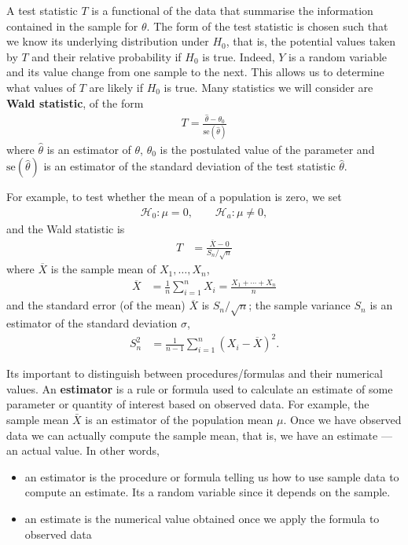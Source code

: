 \documentclass[
  11pt,
  letterpaper,
]{book}
\providecommand{\tightlist}{%
  \setlength{\itemsep}{0pt}\setlength{\parskip}{0pt}}
\theoremstyle{definition}
\theoremstyle{definition}
\theoremstyle{definition}
\theoremstyle{remark}
\begin{document}
A test statistic \(T\) is a functional of the data that summarise the information contained in the sample for \(\theta\). The form of the test statistic is chosen such that we know its underlying distribution under \(H_0\), that is, the potential values taken by \(T\) and their relative probability if \(H_0\) is true. Indeed, \(Y\) is a random variable and its value change from one sample to the next.
This allows us to determine what values of \(T\) are likely if \(H_0\) is true. Many statistics we will consider are \textbf{Wald statistic}, of the form
\begin{align*}
T = \frac{\widehat{\theta} - \theta_0}{\mathrm{se}(\widehat{\theta})} 
\end{align*}
where \(\widehat{\theta}\) is an estimator of \(\theta\), \(\theta_0\) is the postulated value of the parameter and \(\mathrm{se}(\widehat{\theta})\) is an estimator of the standard deviation of the test statistic \(\widehat{\theta}\).

For example, to test whether the mean of a population is zero, we set
\begin{align*}
\mathscr{H}_0: \mu=0, \qquad  \mathscr{H}_a:\mu \neq 0, 
\end{align*}
and the Wald statistic is
\begin{align*}
T &= \frac{\overline{X}-0}{S_n/\sqrt{n}}
\end{align*}
where \(\overline{X}\) is the sample mean of \(X_1, \ldots, X_n\),
\begin{align*}
\overline{X} &= \frac{1}{n} \sum_{i=1}^n X_i = \frac{X_1+ \cdots + X_n}{n}
\end{align*}
and the standard error (of the mean) \(\overline{X}\) is \(S_n/\sqrt{n}\); the sample variance \(S_n\) is an estimator of the standard deviation \(\sigma\),
\begin{align*}
S^2_n &= \frac{1}{n-1} \sum_{i=1}^n (X_i-\overline{X})^2.
\end{align*}

Its important to distinguish between procedures/formulas and their numerical values. An \textbf{estimator} is a rule or formula used to calculate an estimate of some parameter or quantity of interest based on observed data. For example, the sample mean \(\bar{X}\) is an estimator of the population mean \(\mu\). Once we have observed data we can actually compute the sample mean, that is, we have an estimate --- an actual value. In other words,

\begin{itemize}
\tightlist
\item
  an estimator is the procedure or formula telling us how to use sample data to compute an estimate. Its a random variable since it depends on the sample.
\item
  an estimate is the numerical value obtained once we apply the formula to observed data
\end{itemize}
\end{document}
